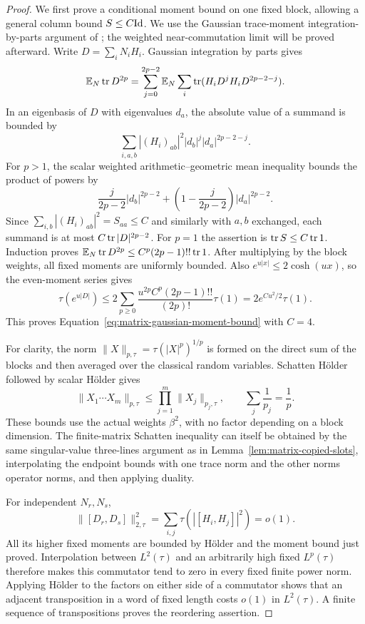 \begin{proof}
We first prove a conditional moment bound on one fixed block, allowing a
general column bound $S\le C\mathrm{Id}$.  We use the Gaussian trace-moment
integration-by-parts argument of \cite[Lemma~6.1 and Section~7]{Tropp2018};
the weighted near-commutation limit will be proved afterward.
Write $D=\sum_iN_iH_i$.
Gaussian integration by parts gives
\[
 \mathbb E_N\operatorname{tr} D^{2p}
 =\sum_{j=0}^{2p-2}\mathbb E_N\sum_i
   \operatorname{tr}(H_iD^jH_iD^{2p-2-j}).
\]
In an eigenbasis of $D$ with eigenvalues $d_a$, the absolute value of a
summand is bounded by
\[
 \sum_{i,a,b}|(H_i)_{ab}|^2|d_b|^j|d_a|^{2p-2-j}.
\]
For $p>1$, the scalar weighted arithmetic--geometric mean inequality
bounds the product of powers by
\[
 \frac{j}{2p-2}|d_b|^{2p-2}
 +\left(1-\frac{j}{2p-2}\right)|d_a|^{2p-2}.
\]
Since $\sum_{i,b}|(H_i)_{ab}|^2=S_{aa}\le C$ and similarly with $a,b$
exchanged, each summand is at most $C\operatorname{tr}|D|^{2p-2}$.
For $p=1$ the assertion is $\operatorname{tr} S\le C\operatorname{tr}1$.
Induction proves
$\mathbb E_N\operatorname{tr} D^{2p}\le C^p(2p-1)!!\operatorname{tr}1$.
After multiplying by the block weights, all fixed moments are uniformly
bounded.  Also $e^{u|x|}\le2\cosh(ux)$, so the even-moment series gives
\[
 \tau(e^{u|D|})
 \le2\sum_{p\ge0}\frac{u^{2p}C^p(2p-1)!!}{(2p)!}\tau(1)
 =2e^{Cu^2/2}\tau(1).
\]
This proves Equation~\eqref{eq:matrix-gaussian-moment-bound} with $C=4$.

For clarity, the norm $\|X\|_{p,\tau}=\tau(|X|^p)^{1/p}$ is formed on
the direct sum of the blocks and then averaged over the classical random
variables.  Schatten H\"older followed by scalar H\"older gives
\[
 \|X_1\cdots X_m\|_{p,\tau}
 \le\prod_{j=1}^m\|X_j\|_{p_j,\tau},
 \qquad \sum_j\frac1{p_j}=\frac1p.
\]
These bounds use the actual weights $\beta^2$, with no factor depending
on a block dimension.  The finite-matrix Schatten inequality can itself
be obtained by the same singular-value three-lines argument as in
Lemma~\ref{lem:matrix-copied-slots}, interpolating the endpoint bounds
with one trace norm and the other norms operator norms, and then applying
duality.

For independent $N_r,N_s$,
\[
 \|[D_r,D_s]\|_{2,\tau}^2
 =\sum_{i,j}\tau(|[H_i,H_j]|^2)=o(1).
\]
All its higher fixed moments are bounded by H\"older and the moment bound
just proved.  Interpolation between $L^2(\tau)$ and an arbitrarily high
fixed $L^p(\tau)$ therefore makes this commutator tend to zero in every
fixed finite power norm.  Applying H\"older to the factors on either side
of a commutator shows that an adjacent transposition in a word of fixed
length costs $o(1)$ in $L^2(\tau)$.  A finite sequence of transpositions
proves the reordering assertion.


\end{proof}
